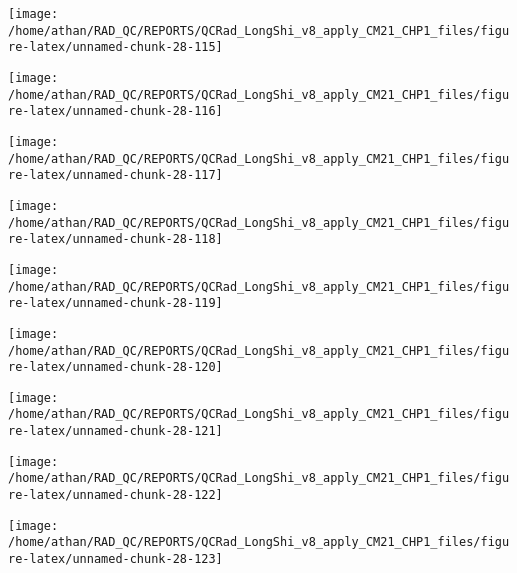 \documentclass[
  10pt,
  a4paper,oneside]{article}
\begin{document}
\begin{center}\texttt{[image: /home/athan/RAD\_QC/REPORTS/QCRad\_LongShi\_v8\_apply\_CM21\_CHP1\_files/figure-latex/unnamed-chunk-28-115]} \end{center}

\begin{center}\texttt{[image: /home/athan/RAD\_QC/REPORTS/QCRad\_LongShi\_v8\_apply\_CM21\_CHP1\_files/figure-latex/unnamed-chunk-28-116]} \end{center}

\begin{center}\texttt{[image: /home/athan/RAD\_QC/REPORTS/QCRad\_LongShi\_v8\_apply\_CM21\_CHP1\_files/figure-latex/unnamed-chunk-28-117]} \end{center}

\begin{center}\texttt{[image: /home/athan/RAD\_QC/REPORTS/QCRad\_LongShi\_v8\_apply\_CM21\_CHP1\_files/figure-latex/unnamed-chunk-28-118]} \end{center}

\begin{center}\texttt{[image: /home/athan/RAD\_QC/REPORTS/QCRad\_LongShi\_v8\_apply\_CM21\_CHP1\_files/figure-latex/unnamed-chunk-28-119]} \end{center}

\begin{center}\texttt{[image: /home/athan/RAD\_QC/REPORTS/QCRad\_LongShi\_v8\_apply\_CM21\_CHP1\_files/figure-latex/unnamed-chunk-28-120]} \end{center}

\begin{center}\texttt{[image: /home/athan/RAD\_QC/REPORTS/QCRad\_LongShi\_v8\_apply\_CM21\_CHP1\_files/figure-latex/unnamed-chunk-28-121]} \end{center}

\begin{center}\texttt{[image: /home/athan/RAD\_QC/REPORTS/QCRad\_LongShi\_v8\_apply\_CM21\_CHP1\_files/figure-latex/unnamed-chunk-28-122]} \end{center}

\begin{center}\texttt{[image: /home/athan/RAD\_QC/REPORTS/QCRad\_LongShi\_v8\_apply\_CM21\_CHP1\_files/figure-latex/unnamed-chunk-28-123]} \end{center}
\end{document}
